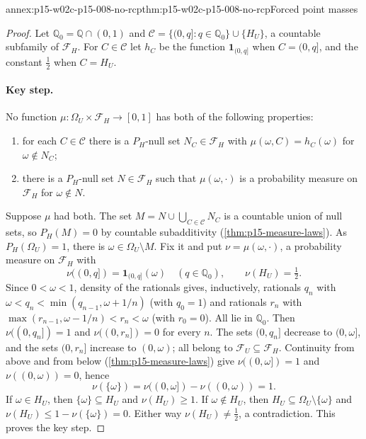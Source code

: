 \begin{annexitem}{annex:p15-w02c-p15-008-no-rcp}{thm:p15-w02c-p15-008-no-rcp}{Forced point masses}
\begin{proof}
Let \(\mathbb Q_0=\mathbb Q\cap(0,1)\) and
\(\mathcal C=\{(0,q]:q\in\mathbb Q_0\}\cup\{H_U\}\), a countable subfamily
of \(\mathcal F_H\). For \(C\in\mathcal C\) let \(h_C\) be the function
\(\mathbf1_{(0,q]}\) when \(C=(0,q]\), and the constant \(\tfrac12\) when
\(C=H_U\).

\paragraph{Key step.}
No function \(\mu:\Omega_U\times\mathcal F_H\to[0,1]\) has both of the
following properties:
\begin{enumerate}
\item[(a)] for each \(C\in\mathcal C\) there is a \(P_H\)-null set
      \(N_C\in\mathcal F_H\) with \(\mu(\omega,C)=h_C(\omega)\) for
      \(\omega\notin N_C\);
\item[(b)] there is a \(P_H\)-null set \(N\in\mathcal F_H\) such that
      \(\mu(\omega,\cdot)\) is a probability measure on
      \(\mathcal F_H\) for \(\omega\notin N\).
\end{enumerate}
Suppose \(\mu\) had both. The set \(M=N\cup\bigcup_{C\in\mathcal C}N_C\)
is a countable union of null sets, so \(P_H(M)=0\) by countable
subadditivity (\cref{thm:p15-measure-laws}). As \(P_H(\Omega_U)=1\),
there is \(\omega\in\Omega_U\setminus M\). Fix it and put
\(\nu=\mu(\omega,\cdot)\), a probability measure on \(\mathcal F_H\) with
\[
 \nu((0,q])=\mathbf1_{(0,q]}(\omega)\quad(q\in\mathbb Q_0),\qquad
 \nu(H_U)=\tfrac12 .
\]
Since \(0<\omega<1\), density of the rationals gives, inductively, rationals
\(q_n\) with \(\omega<q_n<\min(q_{n-1},\omega+1/n)\) (with \(q_0=1\)) and
rationals \(r_n\) with \(\max(r_{n-1},\omega-1/n)<r_n<\omega\) (with
\(r_0=0\)). All lie in \(\mathbb Q_0\). Then \(\nu((0,q_n])=1\) and
\(\nu((0,r_n])=0\) for every \(n\). The sets \((0,q_n]\) decrease to
\((0,\omega]\), and the sets \((0,r_n]\) increase to \((0,\omega)\); all
belong to \(\mathcal F_U\subseteq\mathcal F_H\). Continuity from above
and from below (\cref{thm:p15-measure-laws}) give
\(\nu((0,\omega])=1\) and \(\nu((0,\omega))=0\), hence
\[
 \nu(\{\omega\})=\nu((0,\omega])-\nu((0,\omega))=1 .
\]
If \(\omega\in H_U\), then \(\{\omega\}\subseteq H_U\) and
\(\nu(H_U)\geq1\). If \(\omega\notin H_U\), then
\(H_U\subseteq\Omega_U\setminus\{\omega\}\) and
\(\nu(H_U)\leq1-\nu(\{\omega\})=0\). Either way \(\nu(H_U)\neq\tfrac12\), a
contradiction. This proves the key step.


\end{proof}
\end{annexitem}
